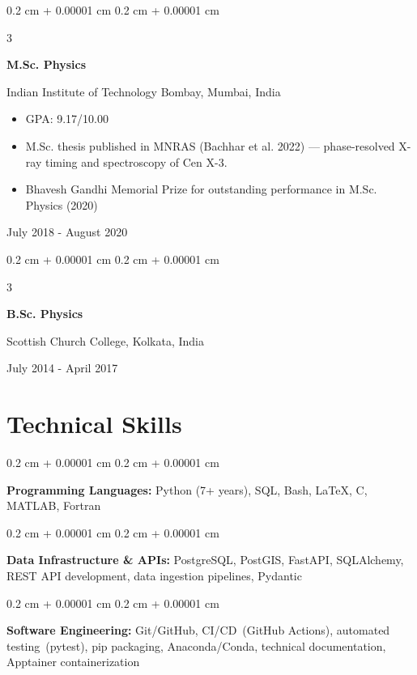 \documentclass[10pt, letterpaper]{article}
\newenvironment{highlights}{
    \begin{itemize}[
        topsep=0.10 cm,
        parsep=0.10 cm,
        partopsep=0pt,
        itemsep=0pt,
        leftmargin=0.4 cm + 10pt
    ]
}{
    \end{itemize}
}
\newenvironment{onecolentry}{
    \begin{adjustwidth}{
        0.2 cm + 0.00001 cm
    }{
        0.2 cm + 0.00001 cm
    }
}{
    \end{adjustwidth}
}
\newenvironment{threecolentry}[3][]{
    \onecolentry
    \def\thirdColumn{#3}
    \setcolumnwidth{2.5 cm, \fill, 4.5 cm}
    \begin{paracol}{3}
    {\raggedright #2} \switchcolumn
}{
    \switchcolumn \raggedleft \thirdColumn
    \end{paracol}
    \endonecolentry
}
\begin{document}
\vspace{0.2 cm}

\begin{threecolentry}{\textbf{M.Sc. Physics}}{
    July 2018 - August 2020
  }
    Indian Institute of Technology Bombay, Mumbai, India
  \begin{highlights}
    \item GPA: 9.17/10.00
    \item M.Sc. thesis published in MNRAS (Bachhar et al. 2022) — phase-resolved X-ray timing and spectroscopy of Cen X-3.
    \item Bhavesh Gandhi Memorial Prize for outstanding performance in 
          M.Sc. Physics (2020)
  \end{highlights}
\end{threecolentry} 

\vspace{0.2 cm}

\begin{threecolentry}{\textbf{B.Sc. Physics}}{
  July 2014 - April 2017
}
  Scottish Church College, Kolkata, India
\end{threecolentry}

\section{Technical Skills}

\begin{onecolentry}
  \textbf{Programming Languages:} Python (7+ years), SQL, Bash, LaTeX, C, MATLAB, Fortran
\end{onecolentry}

\vspace{0.2 cm}

\begin{onecolentry}
  \textbf{Data Infrastructure \& APIs:} PostgreSQL, PostGIS, FastAPI, SQLAlchemy, REST API development, 
  data ingestion pipelines, Pydantic
\end{onecolentry}

\vspace{0.2 cm}

\begin{onecolentry}
  \textbf{Software Engineering:} Git/GitHub, CI/CD~(GitHub Actions), automated testing~(pytest), 
  pip packaging, Anaconda/Conda, technical documentation, Apptainer containerization
\end{onecolentry}

\vspace{0.2 cm}
\end{document}
